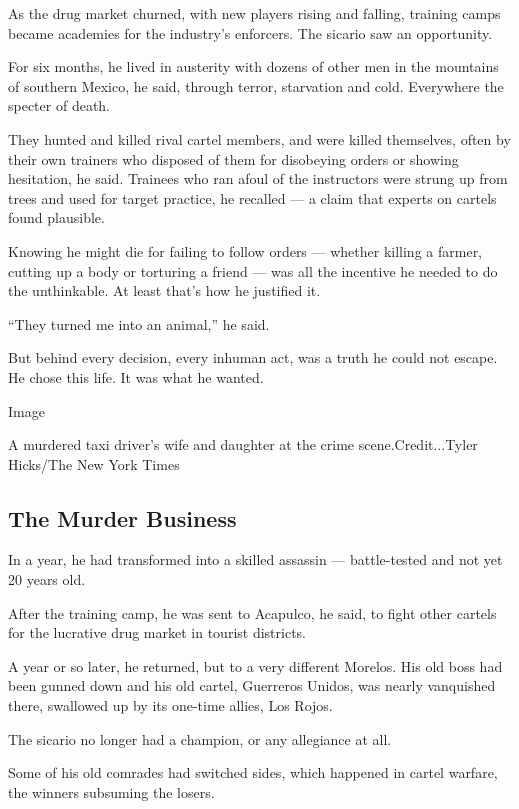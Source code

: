 As the drug market churned, with new players rising and falling,
training camps became academies for the industry's enforcers. The
sicario saw an opportunity.

For six months, he lived in austerity with dozens of other men in the
mountains of southern Mexico, he said, through terror, starvation and
cold. Everywhere the specter of death.

They hunted and killed rival cartel members, and were killed themselves,
often by their own trainers who disposed of them for disobeying orders
or showing hesitation, he said. Trainees who ran afoul of the
instructors were strung up from trees and used for target practice, he
recalled --- a claim that experts on cartels found plausible.

Knowing he might die for failing to follow orders --- whether killing a
farmer, cutting up a body or torturing a friend --- was all the
incentive he needed to do the unthinkable. At least that's how he
justified it.

``They turned me into an animal,'' he said.

But behind every decision, every inhuman act, was a truth he could not
escape. He chose this life. It was what he wanted.

Image

A murdered taxi driver's wife and daughter at the crime
scene.Credit...Tyler Hicks/The New York Times

\hypertarget{the-murder-business}{%
\subsection{The Murder Business}\label{the-murder-business}}

In a year, he had transformed into a skilled assassin --- battle-tested
and not yet 20 years old.

After the training camp, he was sent to Acapulco, he said, to fight
other cartels for the lucrative drug market in tourist districts.

A year or so later, he returned, but to a very different Morelos. His
old boss had been gunned down and his old cartel, Guerreros Unidos, was
nearly vanquished there, swallowed up by its one-time allies, Los Rojos.

The sicario no longer had a champion, or any allegiance at all.

Some of his old comrades had switched sides, which happened in cartel
warfare, the winners subsuming the losers.

